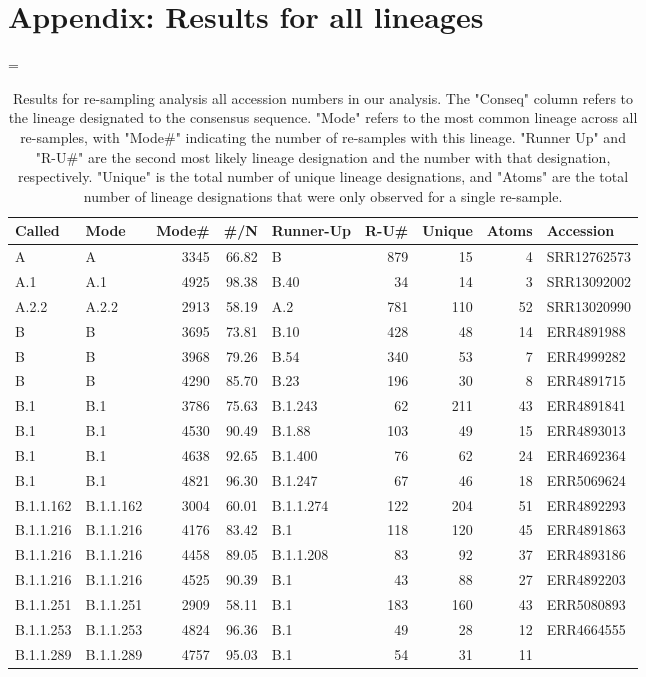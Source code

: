 \documentclass[
]{article}
\begin{document}
\hypertarget{appendix-results-for-all-lineages}{%
\section{Appendix: Results for all
lineages}\label{appendix-results-for-all-lineages}}

\LTcapwidth=\textwidth

\scriptsize

\begin{longtable}[]{@{}llrrlrrrl@{}}
\caption{\label{tab:pango}Results for re-sampling analysis all accession numbers in our analysis. The "Conseq" column refers to the lineage designated to the consensus sequence. "Mode" refers to the most common lineage across all re-samples, with "Mode\#" indicating the number of re-samples with this lineage. "Runner Up" and "R-U\#" are the second most likely lineage designation and the number with that designation, respectively. "Unique" is the total number of unique lineage designations, and "Atoms" are the total number of lineage designations that were only observed for a single re-sample.}\\
\toprule
Called & Mode & Mode\# & \#/N & Runner-Up & R-U\# & Unique & Atoms & Accession\tabularnewline
\midrule
\endhead
A & A & 3345 & 66.82 & B & 879 & 15 & 4 & SRR12762573\tabularnewline
A.1 & A.1 & 4925 & 98.38 & B.40 & 34 & 14 & 3 &
SRR13092002\tabularnewline
A.2.2 & A.2.2 & 2913 & 58.19 & A.2 & 781 & 110 & 52 &
SRR13020990\tabularnewline
B & B & 3695 & 73.81 & B.10 & 428 & 48 & 14 & ERR4891988\tabularnewline
B & B & 3968 & 79.26 & B.54 & 340 & 53 & 7 & ERR4999282\tabularnewline
B & B & 4290 & 85.70 & B.23 & 196 & 30 & 8 & ERR4891715\tabularnewline
B.1 & B.1 & 3786 & 75.63 & B.1.243 & 62 & 211 & 43 &
ERR4891841\tabularnewline
B.1 & B.1 & 4530 & 90.49 & B.1.88 & 103 & 49 & 15 &
ERR4893013\tabularnewline
B.1 & B.1 & 4638 & 92.65 & B.1.400 & 76 & 62 & 24 &
ERR4692364\tabularnewline
B.1 & B.1 & 4821 & 96.30 & B.1.247 & 67 & 46 & 18 &
ERR5069624\tabularnewline
B.1.1.162 & B.1.1.162 & 3004 & 60.01 & B.1.1.274 & 122 & 204 & 51 &
ERR4892293\tabularnewline
B.1.1.216 & B.1.1.216 & 4176 & 83.42 & B.1 & 118 & 120 & 45 &
ERR4891863\tabularnewline
B.1.1.216 & B.1.1.216 & 4458 & 89.05 & B.1.1.208 & 83 & 92 & 37 &
ERR4893186\tabularnewline
B.1.1.216 & B.1.1.216 & 4525 & 90.39 & B.1 & 43 & 88 & 27 &
ERR4892203\tabularnewline
B.1.1.251 & B.1.1.251 & 2909 & 58.11 & B.1 & 183 & 160 & 43 &
ERR5080893\tabularnewline
B.1.1.253 & B.1.1.253 & 4824 & 96.36 & B.1 & 49 & 28 & 12 &
ERR4664555\tabularnewline
B.1.1.289 & B.1.1.289 & 4757 & 95.03 & B.1 & 54 & 31 & 11 &

\end{longtable}
\end{document}

